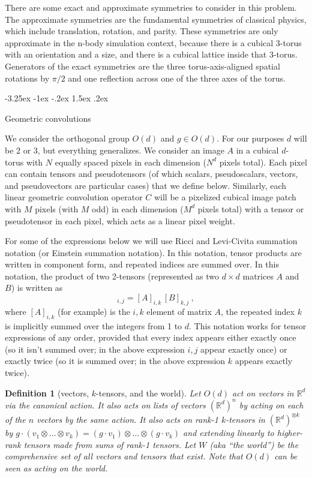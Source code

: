 \documentclass{article}
\makeatletter
\theoremstyle{plain}
\newtheorem{definition}{Definition}
\renewcommand\section{\@startsection {section}{1}{\z@}%
  {-3.25ex \@plus -1ex \@minus -.2ex}%
  {1.5ex \@plus .2ex}%
  {\raggedright\normalfont\large\bfseries}}
\makeatother
\begin{document}
There are some exact and approximate symmetries to consider in this problem.
The approximate symmetries are the fundamental symmetries of classical physics, which include translation, rotation, and parity.
These symmetries are only approximate in the n-body simulation context, because there is a cubical 3-torus with an orientation and a size, and there is a cubical lattice inside that 3-torus.
Generators of the exact symmetries are the three torus-axis-aligned spatial rotations by $\pi/2$ and one reflection across one of the three axes of the torus.

\section{Geometric convolutions}\label{sec:convolution}

We consider the orthogonal group $O(d)$ and $g\in O(d)$. For our purposes $d$ will be 2 or 3, but everything generalizes.  
We consider an image $A$ in a cubical $d$-torus with $N$ equally spaced pixels in each dimension ($N^d$ pixels total). Each pixel can contain tensors and pseudotensors (of which scalars, pseudoscalars, vectors, and pseudovectors are particular cases) that we define below.
Similarly, each linear geometric convolution operator $C$ will be a pixelized cubical image patch with $M$ pixels (with $M$ odd) in each dimension ($M^d$ pixels total) with a tensor or pseudotensor in each pixel, which acts as a linear pixel weight.

For some of the expressions below we will use Ricci and Levi-Civita summation notation (or Einstein summation notation).
In this notation, tensor products are written in component form, and repeated indices are summed over.
In this notation, the product of two 2-tensors (represented as two $d\times d$ matrices $A$ and $B$) is written as
\begin{equation}
    [A\, B]_{i,j} = [A]_{i,k}\,[B]_{k,j} ~,
\end{equation}
where $[A]_{i,k}$ (for example) is the $i,k$ element of matrix $A$, the repeated index $k$ is implicitly summed over the integers from 1 to $d$.
This notation works for tensor expressions of any order, provided that every index appears either exactly once (so it isn't summed over; in the above expression $i, j$ appear exactly once) or exactly twice (so it is summed over; in the above expression $k$ appears exactly twice). 

\begin{definition}[vectors, $k$-tensors, and the world]
Let $O(d)$ act on vectors in $\mathbb R^d$ via the canonical action.
It also acts on lists of vectors $(\mathbb R^d)^n$ by acting on each of the $n$ vectors by the same action.
It also acts on rank-1 $k$-tensors in $(\mathbb R^d)^{\otimes k}$ by $g\cdot (v_{1}\otimes\ldots \otimes v_k) = (g\cdot v_1)\otimes \ldots \otimes (g\cdot v_k)$ and extending linearly to higher-rank tensors made from sums of rank-1 tensors.
Let $W$ (aka ``the world'') be the comprehensive set of all vectors and tensors that exist.
Note that $O(d)$ can be seen as acting on the world.
\end{definition}
\end{document}
